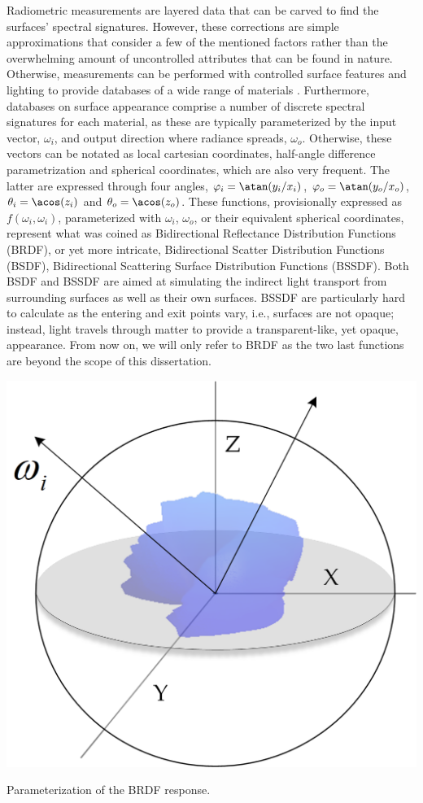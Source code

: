 Radiometric measurements are layered data that can be carved to find the surfaces' spectral signatures. However, these corrections are simple approximations that consider a few of the mentioned factors rather than the overwhelming amount of uncontrolled attributes that can be found in nature. Otherwise, measurements can be performed with controlled surface features and lighting to provide databases of a wide range of materials \cite{dupuy_adaptive_2018}. Furthermore, databases on surface appearance comprise a number of discrete spectral signatures for each material, as these are typically parameterized by the input vector, $\omega_i$, and output direction where radiance spreads, $\omega_o$. Otherwise, these vectors can be notated as local cartesian coordinates, half-angle difference parametrization and spherical coordinates, which are also very frequent. The latter are expressed through four angles, $\varphi_i = \atan(y_i / x_i)$, $\varphi_o = \atan(y_o / x_o)$, $\theta_i = \acos(z_i)$ and $\theta_o = \acos(z_o)$. These functions, provisionally expressed as $f(\omega_i, \omega_i)$, parameterized with $\omega_i$, $\omega_o$, or their equivalent spherical coordinates, represent what was coined as Bidirectional Reflectance Distribution Functions (BRDF), or yet more intricate, Bidirectional Scatter Distribution Functions (BSDF), Bidirectional Scattering Surface Distribution Functions (BSSDF). Both BSDF and BSSDF are aimed at simulating the indirect light transport from surrounding surfaces as well as their own surfaces. BSSDF are particularly hard to calculate as the entering and exit points vary, i.e., surfaces are not opaque; instead, light travels through matter to provide a transparent-like, yet opaque, appearance. From now on, we will only refer to BRDF as the two last functions are beyond the scope of this dissertation.
\begin{marginfigure}[3cm]
	\includegraphics{figs/fundamentals/brdf_wi_wo.png}
	\caption{Parameterization of the BRDF response.}
	\label{fig:brdf_wi_wo}
\end{marginfigure}

